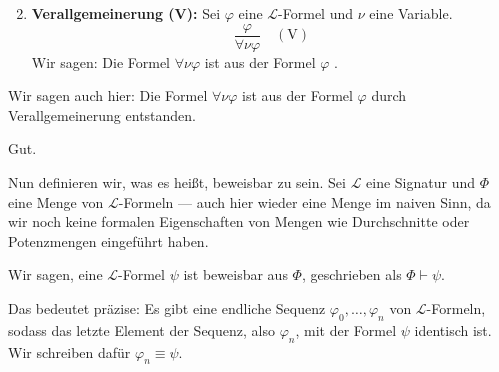 \begin{math-stroke}
\begin{enumerate}[label=\textbf{(\arabic*)}]
    \setcounter{enumi}{1} \item \textbf{Verallgemeinerung (V):}
    Sei $\varphi$ eine $\mathcal{L}$-Formel und $\nu$ eine Variable.
    \[
    \frac{\varphi}{\forall \nu \varphi} \quad (\text{V})
    \]
    Wir sagen: Die Formel $\forall \nu \varphi$ ist aus der Formel $\varphi$ .
\end{enumerate}
\end{math-stroke}

\begin{spoken-clean}[00:15:23 - 00:17:15]
Wir sagen auch hier: Die Formel $\forall \nu \varphi$ ist aus der Formel $\varphi$ durch Verallgemeinerung entstanden. 

Gut. 

\end{spoken-clean}

\begin{spoken-clean}[00:17:15 - 00:19:30]
Nun definieren wir, was es heißt, beweisbar zu sein. Sei $\mathcal{L}$ eine Signatur und $\Phi$ eine Menge von $\mathcal{L}$-Formeln --- auch hier wieder eine Menge im naiven Sinn, da wir noch keine formalen Eigenschaften von Mengen wie Durchschnitte oder Potenzmengen eingeführt haben. 

Wir sagen, eine $\mathcal{L}$-Formel $\psi$ ist beweisbar aus $\Phi$, geschrieben als $\Phi \vdash \psi$. 

Das bedeutet präzise: Es gibt eine endliche Sequenz $\varphi_0, \dots, \varphi_n$ von $\mathcal{L}$-Formeln, sodass das letzte Element der Sequenz, also $\varphi_n$, mit der Formel $\psi$ identisch ist. Wir schreiben dafür $\varphi_n \equiv \psi$.
\end{spoken-clean}

\begin{math-stroke}
\end{math-stroke}

